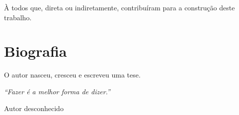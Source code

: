 \documentclass[tese]{UFRuralRJ}
\begin{document}
À todos que, direta ou indiretamente, contribuíram para a construção deste 
trabalho.


\chapter*{Biografia}
O autor nasceu, cresceu e escreveu uma tese.


\clearpage\mbox{}\vfill\hspace{80mm}\begin{minipage}{76mm}\begin{flushright}{\em
``Fazer é a melhor forma de dizer.''
\par
Autor desconhecido
}\end{flushright}\end{minipage}


\generalabstracttrue
\begin{abstract}
Este é o resumo em português de minha tese escrita em português. Claramente, 
este é o melhor resumo que já foi escrito em um documento acadêmico produzido na
UFRuralRJ.
\end{abstract}
\end{document}
